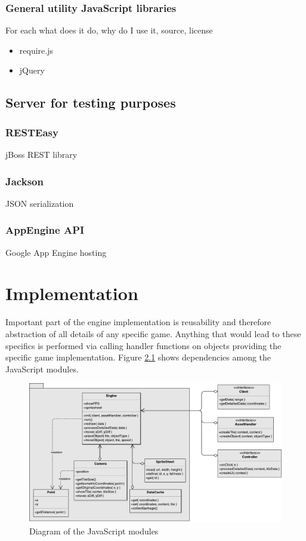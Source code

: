 \documentclass[11pt,oneside, final]{fithesis2}
\begin{document}
\subsection{General utility JavaScript libraries}
For each what does it do, why do I use it, source, license
\begin{itemize}
	\item require.js
	\item jQuery
\end{itemize}

\section{Server for testing purposes}
\subsection{RESTEasy}
jBoss REST library

\subsection{Jackson}
JSON serialization

\subsection{AppEngine API}
Google App Engine hosting

\chapter{Implementation}
\label{implementation}
Important part of the engine implementation is reusability and therefore abstraction of all details of any specific game. Anything that would lead to these specifics is performed via calling handler functions on objects providing the specific game implementation. Figure \ref{classdiagram} shows dependencies among the JavaScript modules.

\begin{figure}[htp]
	\centering
	\includegraphics[width=\textwidth]{thesis-classdiagram}
	\caption{Diagram of the JavaScript modules}
	\label{classdiagram}
\end{figure}
\end{document}
